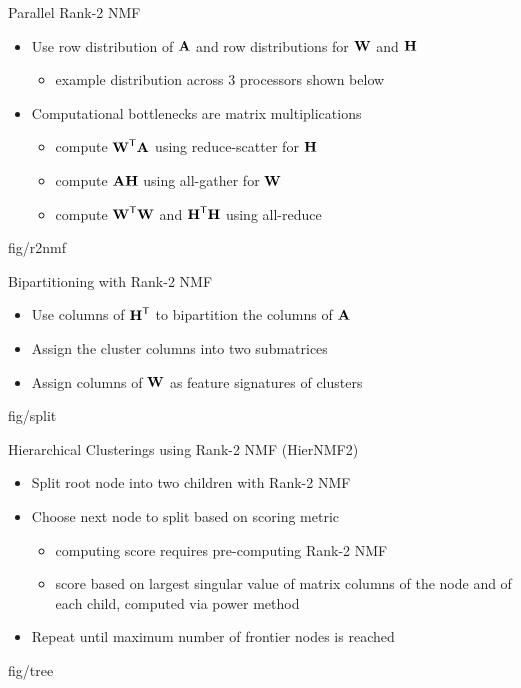 \documentclass{beamer}
\begin{document}
\begin{frame}{Parallel Rank-2 NMF}
    \begin{itemize}
        \item Use row distribution of $\M{A}$ and row distributions for $\M{W}$ and $\M{H}$ 
        \begin{itemize}
        		\item example distribution across 3 processors shown below
	\end{itemize}
        \item Computational bottlenecks are matrix multiplications
        \begin{itemize}
            \item compute $\M{W}^\Tra\M{A}$ using reduce-scatter for $\M{H}$
            \item compute $\M{A}\M{H}$ using all-gather for $\M{W}$
            \item compute $\M{W}^\Tra\M{W}$ and $\M{H}^\Tra\M{H}$ using all-reduce
        \end{itemize}
    \end{itemize}
        {fig/r2nmf}
\end{frame}

\begin{frame}{Bipartitioning with Rank-2 NMF}
    \begin{itemize}
        \item Use columns of $\M{H}^\Tra$ to bipartition the columns of $\M{A}$
        \item Assign the cluster columns into two submatrices
        \item Assign columns of $\M{W}$ as feature signatures of clusters
    \end{itemize}
    \begin{adjustbox}{max totalsize={.7\textwidth}{.6\textheight},center}
        {fig/split}
    \end{adjustbox}
\end{frame}

\begin{frame}{Hierarchical Clusterings using Rank-2 NMF (HierNMF2)}
    \begin{itemize}
        \item Split root node into two children with Rank-2 NMF
        \item Choose next node to split based on scoring metric
        \begin{itemize}
        		\item computing score requires pre-computing Rank-2 NMF
		\item score based on largest singular value of matrix columns of the node and of each child, computed via power method
	\end{itemize}
        \item Repeat until maximum number of frontier nodes is reached
    \end{itemize}
    \begin{adjustbox}{max totalsize={.7\textwidth}{.6\textheight},center}
        {fig/tree}
    \end{adjustbox}
\end{frame}
\end{document}
